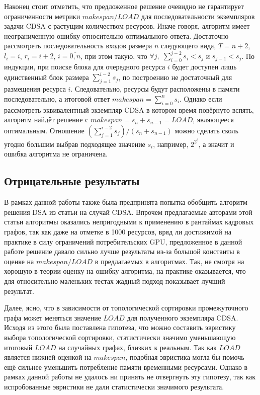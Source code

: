 Наконец стоит отметить, что предложенное решение очевидно не гарантирует ограниченности метрики $makespan/LOAD$ для последовательности экземпляров задачи CDSA с растущим количеством ресурсов.
Иначе говоря, алгоритм имеет неограниченную ошибку относительно оптимального ответа.
Достаточно рассмотреть последовательность входов размера $n$ следующего вида, $T = n + 2$, $l_i = i$, $r_i = i + 2$, $i = \overline{0,n}$, при этом такую, что $\forall j,\;\sum_{i=0}^{j-2} s_i < s_j$ и $s_{j-1} < s_j$.
По индукции, при поиске блока для очередного ресурса $i$ будет доступен лишь единственный блок размера $\sum_{j=1}^{i-2} s_j$, по построению не достаточный для размещения ресурса $i$.
Следовательно, ресурсы будут расположены в памяти последовательно, а итоговой ответ $makespan = \sum_{i=0}^n s_i$.
Однако если рассмотреть эквивалентный экземпляр CDSA в котором время повёрнуто вспять, алгоритм найдёт решение с $makespan = s_n + s_{n-1} = LOAD$, являющееся оптимальным.
Отношение $\left(\sum_{j=1}^{i-2} s_j\right)/\left(s_n + s_{n-1}\right)$ можно сделать сколь угодно большим выбрав подходящее значение $s_i$, например, $2^{2^i}$, а значит и ошибка алгоритма не ограничена.

\subsection{Отрицательные результаты} \label{negativeResults}
В рамках данной работы также была предпринята попытка обобщить алгоритм решения DSA из статьи \cite{buchsbaum_opt_2003} на случай CDSA.
Впрочем предлагаемые авторами этой статьи алгоритмы оказались непригодными к применению в рантаймах кадровых графов, так как даже на отметке в 1000 ресурсов, вряд ли достижимой на практике в силу ограничений потребительских GPU, предложенное в данной работе решение давало сильно лучше результаты из-за большой константы в оценке на $makespan/LOAD$ в предлагаемых в \cite{buchsbaum_opt_2003} алгоритмах.
Так, не смотря на хорошую в теории оценку на ошибку алгоритма, на практике оказывается, что для относительно маленьких тестах жадный подход показывает лучший результат.

Далее, ясно, что в зависимости от топологической сортировки промежуточного графа может меняться значение $LOAD$ для полученного экземпляра CDSA.
Исходя из этого была поставлена гипотеза, что можно составить эвристику выбора топологической сортировки, статистически значимо уменьшающую итоговый $LOAD$ на случайных графах, близких к реальным.
Так как $LOAD$ является нижней оценкой на $makespan$, подобная эвристика могла бы помочь ещё сильнее уменьшить потребление памяти временными ресурсами.
Однако в рамках данной работы не удалось ни принять не отвергнуть эту гипотезу, так как испробованные эвристики не дали статистически значимого результата.
